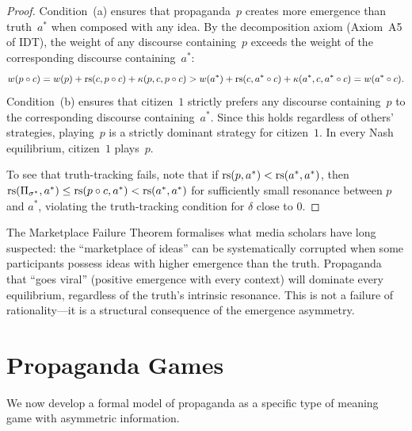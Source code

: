 \begin{proof}
Condition~(a) ensures that propaganda~$p$ creates more emergence
than truth~$a^*$ when composed with any idea.  By the decomposition
axiom (Axiom~A5 of IDT), the weight of any discourse containing~$p$
exceeds the weight of the corresponding discourse containing~$a^*$:
\[
  w(p \circ c) = w(p) + \mathrm{rs}(c, p \circ c)
  + \kappa(p,c,p\circ c)
  > w(a^*) + \mathrm{rs}(c, a^* \circ c)
  + \kappa(a^*,c,a^*\circ c)
  = w(a^* \circ c).
\]
Condition~(b) ensures that citizen~$1$ strictly prefers any
discourse containing~$p$ to the corresponding discourse
containing~$a^*$.  Since this holds regardless of others'
strategies, playing~$p$ is a strictly dominant strategy for
citizen~$1$.  In every Nash equilibrium, citizen~$1$ plays~$p$.

To see that truth-tracking fails, note that if $\mathrm{rs}(p, a^*) < \mathrm{rs}(a^*,a^*)$,
then $\mathrm{rs}(\Pi_{\sigma^*}, a^*) \le \mathrm{rs}(p \circ c, a^*)
< \mathrm{rs}(a^*,a^*)$ for sufficiently small resonance between $p$ and $a^*$,
violating the truth-tracking condition for $\delta$ close to $0$.
\end{proof}

\begin{interpretation}
The Marketplace Failure Theorem formalises what media scholars
have long suspected: the ``marketplace of ideas'' can be systematically
corrupted when some participants possess ideas with higher emergence
than the truth.  Propaganda that ``goes viral'' (positive emergence
with every context) will dominate every equilibrium, regardless of
the truth's intrinsic resonance.  This is not a failure of
rationality---it is a structural consequence of the emergence
asymmetry.
\end{interpretation}

\section{Propaganda Games}
\label{sec:propaganda}

We now develop a formal model of propaganda as a specific type
of meaning game with asymmetric information.

